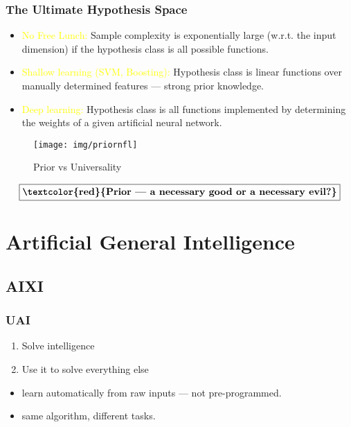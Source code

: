 \documentclass[UTF8,11pt,colorlinks,compress,openany]{beamer}%
\begin{document}
\begin{frame}\frametitle{The Ultimate Hypothesis Space}
\begin{itemize}
	\item \textcolor{yellow}{No Free Lunch:} Sample complexity is exponentially large (w.r.t. the input dimension) if the hypothesis class is all possible functions.
	\item \textcolor{yellow}{Shallow learning (SVM, Boosting):} Hypothesis class is linear functions over manually determined features --- strong prior knowledge.
	\item \textcolor{yellow}{Deep learning:} Hypothesis class is all functions implemented by determining the weights of a given artificial neural network.
\end{itemize}\vspace{-1ex}
	\begin{figure}[H]
	\texttt{[image: img/priornfl]}\vspace{-2ex}\caption{Prior vs Universality}
	\end{figure}
	\[\fbox{\textbf{\textcolor{red}{Prior --- a necessary good or a necessary evil?}}}\]
\end{frame}


\section{Artificial General Intelligence}


\subsection{AIXI}

\begin{frame}\frametitle{UAI}
	\begin{enumerate}
		\item Solve intelligence
		\item Use it to solve everything else
	\end{enumerate}
	\begin{itemize}
		\item learn automatically from raw inputs --- not pre-programmed.
		\item same algorithm, different tasks.
	\end{itemize}
\end{frame}
\end{document}
